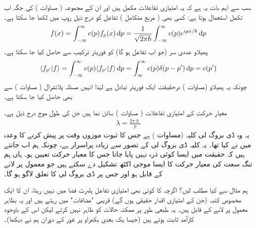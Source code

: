 سب سے اہم بات یہ ہے کہ یہ امتیازی تفاعلات مکمل ہیں اور ان کے مجموعہ ( مساوات ) کی جگہ اب تکمل استعمال ہوتا ہے: کسی بھی ( مربع  متکامل ) تفاعل  کو درج ذیل روپ میں لکھا جا سکتا ہے۔
\begin{align}\label{مساوات_قواعد_تفاعل_بطور_فوریئر_تکمل}
f(x) = \int_{-\infty}^{\infty} c(p)f_{p}(x)\dif p = \frac{1}{\sqrt{2\pi\hslash}}\int_{-\infty}^{\infty}c(p)e^{ipx/\hslash}\dif p
\end{align}
پھیلاو عددی سر (جو اب تفاعل  ہو گا) کو فوریئر ترکیب سے حاصل کیا جا سکتا ہے۔
\begin{align}
\langle f_{p'} | f \rangle = \int_{-\infty}^{\infty} c(p) \langle f_{p'} | f \rangle \dif p = \int_{\infty}^{\infty}c(p)\delta (p-p') \dif p = c(p')
\end{align}
چونکہ یہ پھیلاو (مساوات ) درحقیقت ایک فوریئر تبادل ہے لہٰذا انہیں مسئلہ پلانشرال ( مساوات ) سے بھی حاصل کیا جا سکتا ہے۔ 

معیار حرکت کے امتیازی تفاعلات ( مساوات ) سائن نما ہیں جن کی طول موج درج ذیل ہے۔
\begin{align}
\lambda = \frac{2\pi\hslash}{p} 
\end{align}
یہ وہ ڈی بروگ لی کلیہ (مساوات ) ہے جس کا ثبوت موزوں وقت پر پیش کرنے کا وعدہ میں نے کیا تھا۔ یہ کلیہ ڈی بروگ لی کے تصور سے زیادہ پراسرار ہے، چونکہ ہم اب جانتے ہیں کہ حقیقت میں ایسا کوئی ذرہ نہیں پایا جاتا جس کا معیار حرکت تعیین ہو۔ ہاں ہم تنگ سعت کی معیار حرکت کا ایسا موجی اکٹھ تشکیل دے سکتے ہیں جو معمول پر لانے کے قابل ہو اور جس پر ڈی بروگ لی کا تعلق لاگو ہو گا۔

ہم مثال  سے کیا مطلب لیں؟ اگرچہ  کا کوئی بھی امتیازی تفاعل ہلبرٹ فضا میں نہیں رہتا، ان کا ایک مخصوص کنبہ (جن کے امتیازی اقدار حقیقی ہوں گے) قریبی "مضافات" میں رہتے ہیں اور یہ بظاہر معمول پر لانے کے قابل ہیں۔ یہ طبعی طور پر ممکنہ حالات کو ظاہر نہیں کرتے لیکن اس کے باوجود کارآمد ثابت ہوتے ہیں (جیسا یک بعدی بکھراو پر غور کے دوران ہم نے دیکھا)۔


